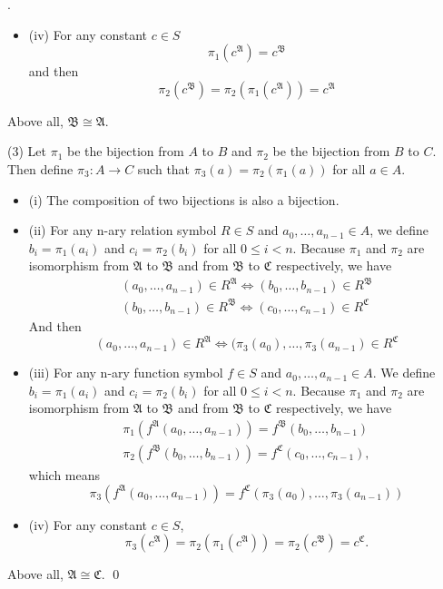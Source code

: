 \documentclass[10pt,a4paper]{article}
\newenvironment{sol}[1]
{\par\vspace{3mm}\noindent{\it Solution #1}.}
{\qed}
\newcommand{\fA}{\mathfrak{A}}
\newcommand{\fB}{\mathfrak{B}}
\newcommand{\fC}{\mathfrak{C}}
\begin{document}
\begin{sol}{2.1}
\begin{itemize}
			\item (iv) For any constant $c \in S$
			$$
				\pi_1(c^\fA) = c^\fB
			$$
			and then
			$$
				\pi_2(c^\fB) = \pi_2(\pi_1(c^\fA)) = c^\fA 
			$$
		\end{itemize}
		Above all, $\fB \cong \fA$.
		
		(3) Let $\pi_1$ be the bijection from $A$ to $B$ and $\pi_2$ be the bijection from $B$ to $C$. Then define $\pi_3:A\rightarrow C$ such that $\pi_3(a) = \pi_2(\pi_1(a))$ for all $a \in A$. 
		\begin{itemize}
			\item (i) The composition of two bijections is also a bijection.
			\item (ii) For any n-ary relation symbol $R \in S$ and $a_0, \dots, a_{n-1} \in A$, we define $b_i = \pi_1(a_i)$ and $c_i = \pi_2(b_i)$ for all $0 \leq i < n$. Because $\pi_1$ and $\pi_2$ are isomorphism from $\fA$ to $\fB$ and from $\fB$ to $\fC$ respectively, we have
			\begin{align*}
			(a_0,\dots,a_{n-1}) \in R^\fA \Leftrightarrow (b_0, \dots, b_{n-1}) \in R^\fB \\
			(b_0,\dots,b_{n-1}) \in R^\fB \Leftrightarrow (c_0, \dots, c_{n-1}) \in R^\fC 
			\end{align*}
			And then
			$$
			(a_0,\dots,a_{n-1}) \in R^\fA \Leftrightarrow (\pi_3(a_0), \dots,\pi_3(a_{n-1}) \in R^\fC 
			$$
			\item (iii) For any n-ary function symbol $f \in S$ and $a_0, \dots, a_{n-1}\in A$. We define $b_i = \pi_1(a_i)$ and $c_i = \pi_2(b_i)$ for all $0 \leq i < n$. Because $\pi_1$ and $\pi_2$ are isomorphism from $\fA$ to $\fB$ and from $\fB$ to $\fC$ respectively, we have
			\begin{align*}
			\pi_1(f^\fA(a_0,\dots,a_{n-1})) = f^\fB(b_0,\dots,b_{n-1}) \\
			\pi_2(f^\fB(b_0,\dots,b_{n-1})) = f^\fC(c_0,\dots,c_{n-1}),
			\end{align*} 
			which means
			$$
			\pi_3(f^\fA(a_0,\dots,a_{n-1})) = f^\fC(\pi_3(a_0),\dots,\pi_3(a_{n-1}))
			$$
			\item (iv) For any constant $c \in S$,
			$$
				\pi_3(c^\fA) = \pi_2(\pi_1(c^\fA)) = \pi_2(c^\fB) = c^\fC.
			$$
		\end{itemize}
		Above all, $\fA \cong \fC$.
	\end{sol}
\end{document}
